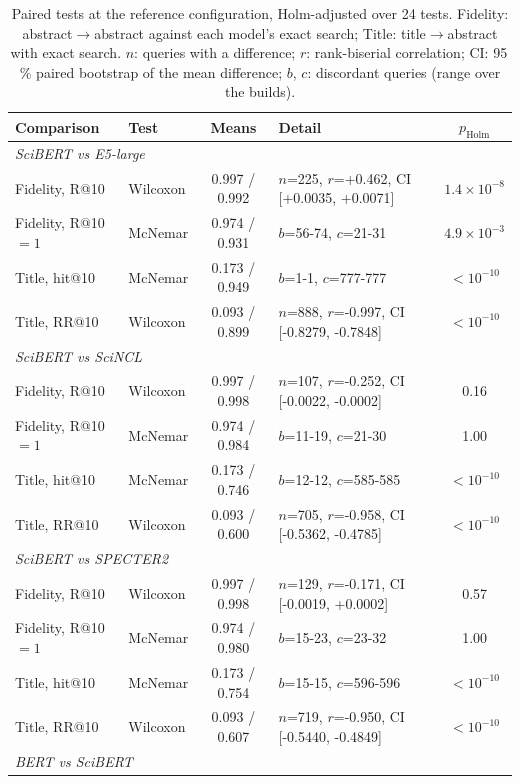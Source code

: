 \begin{table}[tbp]
\caption{Paired tests at the reference configuration, Holm-adjusted over 24 tests. Fidelity: abstract$\rightarrow$abstract against each model's exact search; Title: title$\rightarrow$abstract with exact search. $n$: queries with a difference; $r$: rank-biserial correlation; CI: 95\,\% paired bootstrap of the mean difference; $b$, $c$: discordant queries (range over the builds).}\label{tab:significancia}
\centering
\scriptsize
\begin{tabular}{|l|l|c|l|c|}
\hline
\textbf{Comparison} & \textbf{Test} & \textbf{Means} & \textbf{Detail} & \textbf{$p_{\mathrm{Holm}}$} \\
\hline
\multicolumn{5}{|l|}{\textit{SciBERT vs E5-large}} \\
Fidelity, R@10 & Wilcoxon & 0.997 / 0.992 & $n$=225, $r$=+0.462, CI [+0.0035, +0.0071] & $1.4\times10^{-8}$ \\
Fidelity, R@10$=1$ & McNemar & 0.974 / 0.931 & $b$=56-74, $c$=21-31 & $4.9\times10^{-3}$ \\
Title, hit@10 & McNemar & 0.173 / 0.949 & $b$=1-1, $c$=777-777 & $<10^{-10}$ \\
Title, RR@10 & Wilcoxon & 0.093 / 0.899 & $n$=888, $r$=-0.997, CI [-0.8279, -0.7848] & $<10^{-10}$ \\
\multicolumn{5}{|l|}{\textit{SciBERT vs SciNCL}} \\
Fidelity, R@10 & Wilcoxon & 0.997 / 0.998 & $n$=107, $r$=-0.252, CI [-0.0022, -0.0002] & 0.16 \\
Fidelity, R@10$=1$ & McNemar & 0.974 / 0.984 & $b$=11-19, $c$=21-30 & 1.00 \\
Title, hit@10 & McNemar & 0.173 / 0.746 & $b$=12-12, $c$=585-585 & $<10^{-10}$ \\
Title, RR@10 & Wilcoxon & 0.093 / 0.600 & $n$=705, $r$=-0.958, CI [-0.5362, -0.4785] & $<10^{-10}$ \\
\multicolumn{5}{|l|}{\textit{SciBERT vs SPECTER2}} \\
Fidelity, R@10 & Wilcoxon & 0.997 / 0.998 & $n$=129, $r$=-0.171, CI [-0.0019, +0.0002] & 0.57 \\
Fidelity, R@10$=1$ & McNemar & 0.974 / 0.980 & $b$=15-23, $c$=23-32 & 1.00 \\
Title, hit@10 & McNemar & 0.173 / 0.754 & $b$=15-15, $c$=596-596 & $<10^{-10}$ \\
Title, RR@10 & Wilcoxon & 0.093 / 0.607 & $n$=719, $r$=-0.950, CI [-0.5440, -0.4849] & $<10^{-10}$ \\
\multicolumn{5}{|l|}{\textit{BERT vs SciBERT}} \\

\end{tabular}
\end{table}
